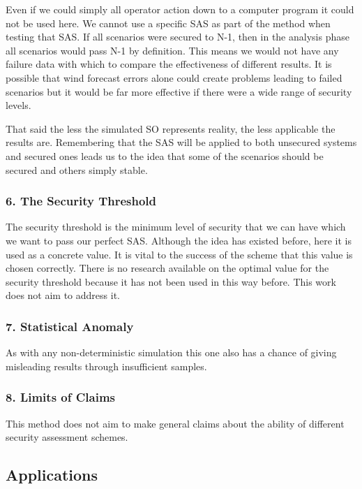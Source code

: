 \documentclass[a4paper,oneside,12pt]{report}
\begin{document}
Even if we could simply all operator action down to a computer program it could not be used here. We cannot use a specific SAS as part of the method when testing that SAS. If all scenarios were secured to N-1, then in the analysis phase all scenarios would pass N-1 by definition. This means we would not have any failure data with which to compare the effectiveness of different results. It is possible that wind forecast errors alone could create problems leading to failed scenarios but it would be far more effective if there were a wide range of security levels.

That said the less the simulated SO represents reality, the less applicable the results are. Remembering that the SAS will be applied to both unsecured systems and secured ones leads us to the idea that some of the scenarios should be secured and others simply stable.

\subsubsection{6. The Security Threshold}

The security threshold is the minimum level of security that we can have which we want to pass our perfect SAS. Although the idea has existed before, here it is used as a concrete value. It is vital to the success of the scheme that this value is chosen correctly. There is no research available on the optimal value for the security threshold because it has not been used in this way before. This work does not aim to address it.

\subsubsection{7. Statistical Anomaly}

As with any non-deterministic simulation this one also has a chance of giving misleading results through insufficient samples.

\subsubsection{8. Limits of Claims}

This method does not aim to make general claims about the ability of different security assessment schemes.

\subsection{Applications} \label{sec_program_applications}
\end{document}
